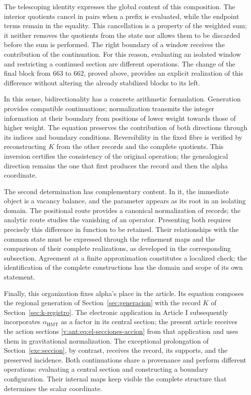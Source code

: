 The telescoping identity expresses the global content of this composition.
The interior quotients cancel in pairs when a prefix is evaluated,
while the endpoint terms remain in the equality. This cancellation is
a property of the weighted sum; it neither removes the quotients from the state nor
allows them to be discarded before the sum is performed. The right boundary of a
window receives the contribution of the continuation. For this reason,
evaluating an isolated window and restricting a continued section
are different operations. The change of the final block from $663$ to
$662$, proved above, provides an explicit realization of this
difference without altering the already stabilized blocks to its left.

In this sense, bidirectionality has a concrete arithmetic
formulation. Generation provides compatible continuations;
normalization transmits the integer information at their boundary from
positions of lower weight towards those of higher weight. The equation preserves the
contribution of both directions through its indices and boundary
conditions. Reversibility in the fixed fibre is verified by reconstructing
$K$ from the other records and the complete quotients. This
inversion certifies the consistency of the original operation; the genealogical
direction remains the one that first produces the record and then
the alpha coordinate.

The second determination has complementary content. In it, the
immediate object is a vacancy balance, and the parameter appears as
its root in an isolating domain. The positional route provides a
canonical normalization of records; the analytic route studies the vanishing
of an operator. Presenting both requires precisely this difference
in function to be retained. Their relationships with the common state must
be expressed through the refinement maps and the comparison of
their complete realizations, as developed in the corresponding
subsection. Agreement at a finite approximation constitutes a
localized check; the identification of the complete constructions
has the domain and scope of its own statement.

Finally, this organization fixes alpha's place in the article. Its
equation composes the regional generation of Section~\ref{sec:generacion}
with the record \(K\) of Section~\ref{sec:k-registro}. The electronic
application in Article I subsequently incorporates \(\alpha_{\mathrm{HMT}}\)
as a factor in its central section; the present article receives the action
sections \eqref{v:ant:eq:el-secciones-accion} from that application and uses
them in gravitational normalization. The exceptional prolongation of
Section~\ref{exc:seccion}, by contrast, receives the record, its supports,
and the preserved incidence. Both continuations share a provenance and
perform different operations: evaluating a central section and constructing
a boundary configuration. Their internal maps keep visible the complete
structure that determines the scalar coordinate.

